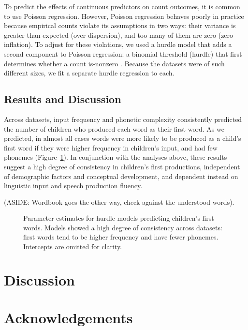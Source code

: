 \documentclass[10pt,letterpaper]{article}
\begin{document}
To predict the effects of continuous predictors on count outcomes, it is common to use Poisson regression. However, Poisson regression behaves poorly in practice because empirical counts violate its assumptions in two ways: their variance is greater than expected (over dispersion), and too many of them are zero (zero inflation). To adjust for these violations, we used a hurdle model that adds a second component to Poisson regression: a binomial threshold (hurdle) that first determines whether a count is-nonzero \cite{mullahy1986}. Because the datasets were of such different sizes, we fit a separate hurdle regression to each.

\subsection{Results and Discussion}

Across datasets, input frequency and phonetic complexity consistently predicted the number of children who produced each word as their first word. As we predicted, in almost all cases words were more likely to be produced as a child's first word if they were higher frequency in children's input, and had few phonemes (Figure~\ref{fig:hurdles}). In conjunction with the analyses above, these results suggest a high degree of consistency in children's first productions, independent of demographic factors and conceptual development, and dependent instead on linguistic input and speech production fluency.

(ASIDE: Wordbook goes the other way, check against the understood words).

\begin{figure}[tb]
\caption{\label{fig:hurdles} Parameter estimates for hurdle models predicting children's first words. Models showed a high degree of consistency across datasets: first words tend to be higher frequency and have fewer phonemes. Intercepts are omitted for clarity.}
\end{figure}

\section{Discussion}

\section{Acknowledgements}




\setlength{\bibleftmargin}{.125in}
\setlength{\bibindent}{--\bibleftmargin}


\end{document}
